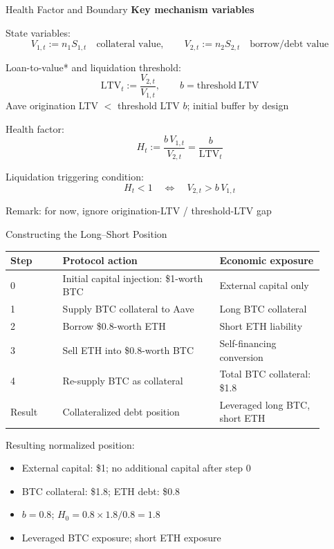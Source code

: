 \documentclass[aspectratio=169,10pt]{beamer}
\begin{document}
\begin{frame}{Health Factor and Boundary}
  \small
  {\bf{Key mechanism variables}}
  \vspace{0.35em}

  State variables:
  \[
    V_{1,t}:=n_1S_{1,t}\quad\text{collateral value},
    \qquad
    V_{2,t}:=n_2S_{2,t}\quad\text{borrow/debt value}
  \]
  \vspace{0.25em}

  Loan-to-value* and liquidation threshold:
  \[
    \mathrm{LTV}_t:=\frac{V_{2,t}}{V_{1,t}},
    \qquad
    b=\mathrm{threshold\ LTV}
  \]
  Aave origination LTV $<$ threshold LTV $b$; initial buffer by design
  \vspace{0.25em}

  Health factor:
  \[
    H_t:=\frac{b\,V_{1,t}}{V_{2,t}}
    =
    \frac{b}{\mathrm{LTV}_t}
  \]
  \vspace{0.25em}

  Liquidation triggering condition:
  \[
    H_t<1
    \quad\Longleftrightarrow\quad
    V_{2,t}>b\,V_{1,t}
  \]

  {\scriptsize * Remark: for now, ignore origination-LTV / threshold-LTV gap}
  \vspace{0.2em}
\end{frame}

\begin{frame}{Constructing the Long--Short Position}
  \begin{center}
    \begin{tabular}{@{}p{0.15\linewidth}p{0.45\linewidth}p{0.30\linewidth}@{}}
      \toprule
      Step & Protocol action & Economic exposure \\
      \midrule
      0 & Initial capital injection: \$1-worth BTC & External capital only \\
      1 & Supply BTC collateral to Aave & Long BTC collateral \\
      2 & Borrow \$0.8-worth ETH & Short ETH liability \\
      3 & Sell ETH into \$0.8-worth BTC & Self-financing conversion \\
      4 & Re-supply BTC as collateral & Total BTC collateral: \$1.8 \\
      \midrule
      Result & Collateralized debt position & Leveraged long BTC, short ETH \\
      \bottomrule
    \end{tabular}
  \end{center}
  \vspace{0.55em}
  Resulting normalized position:
  \begin{itemize}
    \item External capital: \$1; no additional capital after step 0
    \item BTC collateral: \$1.8; ETH debt: \$0.8
    \item $b=0.8$; $H_0=0.8\times1.8/0.8=1.8$
    \item Leveraged BTC exposure; short ETH exposure
  \end{itemize}
\end{frame}
\end{document}

